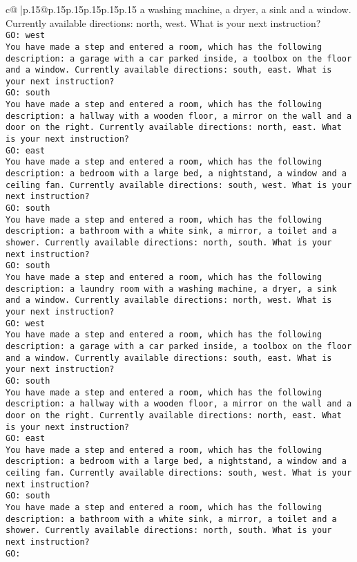 \documentclass{article}
\begin{document}
{\begin{supertabular}{c@{$\;$}|p{.15\linewidth}@{}p{.15\linewidth}p{.15\linewidth}p{.15\linewidth}p{.15\linewidth}p{.15\linewidth}}
{{{a washing machine, a dryer, a sink and a window. Currently available directions: north, west. What is your next instruction?\\ \tt GO: west\\ \tt You have made a step and entered a room, which has the following description: a garage with a car parked inside, a toolbox on the floor and a window. Currently available directions: south, east. What is your next instruction?\\ \tt GO: south\\ \tt You have made a step and entered a room, which has the following description: a hallway with a wooden floor, a mirror on the wall and a door on the right. Currently available directions: north, east. What is your next instruction?\\ \tt GO: east\\ \tt You have made a step and entered a room, which has the following description: a bedroom with a large bed, a nightstand, a window and a ceiling fan. Currently available directions: south, west. What is your next instruction?\\ \tt GO: south\\ \tt You have made a step and entered a room, which has the following description: a bathroom with a white sink, a mirror, a toilet and a shower. Currently available directions: north, south. What is your next instruction?\\ \tt GO: south\\ \tt You have made a step and entered a room, which has the following description: a laundry room with a washing machine, a dryer, a sink and a window. Currently available directions: north, west. What is your next instruction?\\ \tt GO: west\\ \tt You have made a step and entered a room, which has the following description: a garage with a car parked inside, a toolbox on the floor and a window. Currently available directions: south, east. What is your next instruction?\\ \tt GO: south\\ \tt You have made a step and entered a room, which has the following description: a hallway with a wooden floor, a mirror on the wall and a door on the right. Currently available directions: north, east. What is your next instruction?\\ \tt GO: east\\ \tt You have made a step and entered a room, which has the following description: a bedroom with a large bed, a nightstand, a window and a ceiling fan. Currently available directions: south, west. What is your next instruction?\\ \tt GO: south\\ \tt You have made a step and entered a room, which has the following description: a bathroom with a white sink, a mirror, a toilet and a shower. Currently available directions: north, south. What is your next instruction?\\ \tt GO: }}}
\end{supertabular}}
\end{document}
